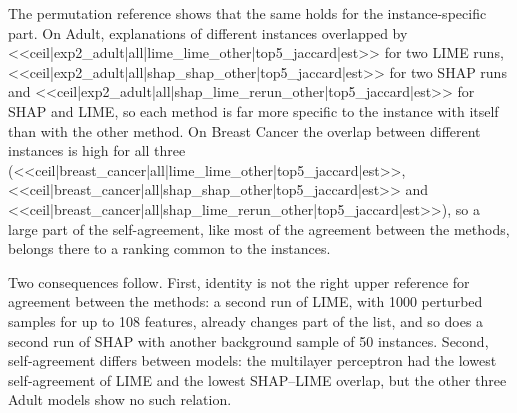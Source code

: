 The permutation reference shows that the same holds for the instance-specific part. On
Adult, explanations of different instances overlapped by <<ceil|exp2_adult|all|lime_lime_other|top5_jaccard|est>> for two
LIME runs, <<ceil|exp2_adult|all|shap_shap_other|top5_jaccard|est>> for two SHAP runs and <<ceil|exp2_adult|all|shap_lime_rerun_other|top5_jaccard|est>>
for SHAP and LIME, so each method is far more specific to the instance with itself than
with the other method. On Breast Cancer the overlap between different instances is high
for all three
(<<ceil|breast_cancer|all|lime_lime_other|top5_jaccard|est>>, <<ceil|breast_cancer|all|shap_shap_other|top5_jaccard|est>> and <<ceil|breast_cancer|all|shap_lime_rerun_other|top5_jaccard|est>>),
so a large part of the self-agreement, like most of the agreement between the methods,
belongs there to a ranking common to the instances.

Two consequences follow. First, identity is not the right upper reference for agreement
between the methods: a second run of LIME, with 1000 perturbed samples for up to 108
features, already changes part of the list, and so does a second run of SHAP with another
background sample of 50 instances. Second, self-agreement differs between models: the
multilayer perceptron had the lowest self-agreement of LIME and the lowest SHAP--LIME
overlap, but the other three Adult models show no such relation.

